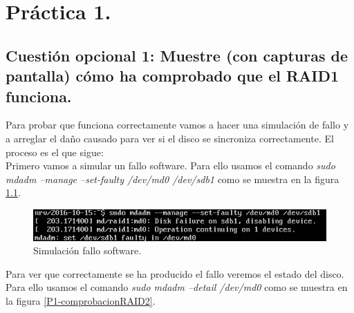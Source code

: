 \documentclass[a4paper,titlepage,12pt]{report}	%
\numberwithin{figure}{section} %
\numberwithin{table}{section} %
\begin{document}
	\tableofcontents
	\clearpage
	\listoffigures %
	\clearpage

	\chapter[Práctica 1.]{Práctica 1.}

	\section[Cuestión opcional 1: Muestre (con capturas de pantalla) cómo ha comprobado que el RAID1 funciona.]{Cuestión opcional 1: Muestre (con capturas de pantalla) cómo ha comprobado que el RAID1 funciona.}

	Para probar que funciona correctamente vamos a hacer una simulación de fallo y a arreglar el daño causado para ver si el disco se sincroniza correctamente. El proceso es el que sigue: \cite{comprobarRAID} \\

	Primero vamos a simular un fallo software. Para ello usamos el comando \textit{sudo mdadm --manage --set-faulty /dev/md0 /dev/sdb1} como se muestra en la figura \ref{P1-comprobacionRAID1}.

	\begin{figure}[H]
		\includegraphics[width=\linewidth]{./Imagenes/P1/ComprobarRAID1.png}
		\vspace{-0.5cm}
		\caption[Simulación fallo software.]{Simulación fallo software.}
		\label{P1-comprobacionRAID1}
	\end{figure}

	Para ver que correctamente se ha producido el fallo veremos el estado del disco. Para ello usamos el comando \textit{sudo mdadm --detail /dev/md0} como se muestra en la figura \ref{P1-comprobacionRAID2}.
\end{document}
